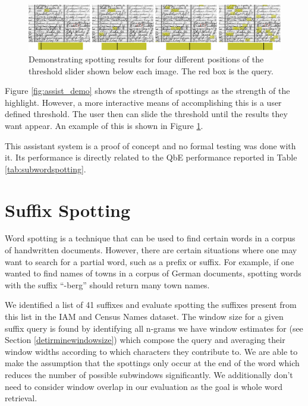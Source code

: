 \documentclass[ms,electronic,twosidetoc,letterpaper,chaptercenter,parttop,lof,lot]{byumsphd}
\begin{document}
\begin{figure}
    \centering
    \includegraphics[width=.99\textwidth]{slider}
    \caption{Demonstrating spotting results for four different positions of the threshold slider shown below each image. The red box is the query.}
    \label{fig:slider}
\end{figure}

Figure \ref{fig:assist_demo} shows the strength of spottings as the strength of the highlight. However, a more interactive means of accomplishing this is a user defined threshold. The user then can slide the threshold until the results they want appear. An example of this is shown in Figure \ref{fig:slider}.

This assistant system is a proof of concept and no formal testing was done with it. Its performance is directly related to the QbE performance reported in Table \ref{tab:subwordspotting}. 






\section{Suffix Spotting}
Word spotting is a technique that can be used to find certain words in a corpus of handwritten documents. However, there are certain situations where one may want to search for a partial word, such as a prefix or suffix. For example, if one wanted to find names of towns in a corpus of German documents, spotting words with the suffix ``-berg'' should return many town names.

We identified a list of 41 suffixes and evaluate spotting the suffixes present from this list in the IAM and Census Names dataset. 
 The window size for a given suffix query is found by identifying all n-grams we have window estimates for (see Section \ref{detirminewindowsize}) which compose the query and averaging their window widths according to which characters they contribute to.
We are able to make the assumption that the spottings only occur at the end of the word which reduces the number of possible subwindows significantly. We additionally don't need to consider window overlap in our evaluation as the goal is whole word retrieval.
\end{document}
